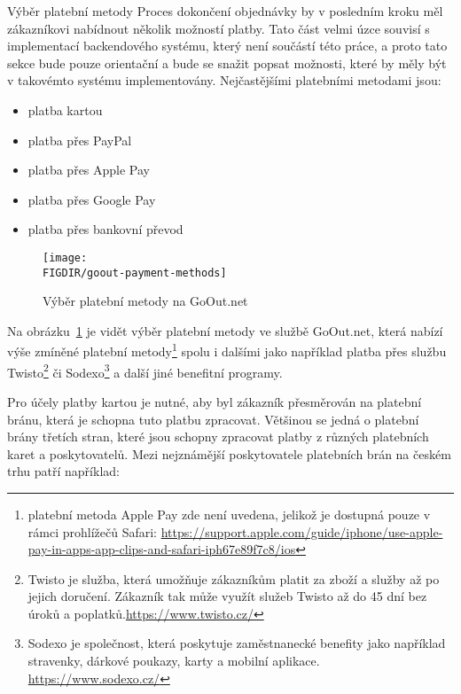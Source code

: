 \begin{subsection}{Výběr platební metody}
    \label{subsec:identifikace-dokonceni-objednavky-vyber-platebni-metody}
    Proces dokončení objednávky by v posledním kroku měl zákazníkovi nabídnout několik možností platby.
    Tato část velmi úzce souvisí s implementací backendového systému, který není součástí této práce, a proto tato sekce bude pouze orientační a bude se snažit popsat možnosti, které by měly být v takovémto systému implementovány.
    Nejčastějšími platebními metodami jsou:

    \begin{itemize}
        \item platba kartou
        \item platba přes PayPal
        \item platba přes Apple Pay
        \item platba přes Google Pay
        \item platba přes bankovní převod
    \end{itemize}

    \begin{figure}[H]
        \centering
        \caption{Výběr platební metody na GoOut.net}
        \texttt{[image: \\FIGDIR/goout-payment-methods]}
        \label{fig:goout-payment-methods}
    \end{figure}

    Na obrázku~\ref{fig:goout-payment-methods} je vidět výběr platební metody ve službě GoOut.net, která nabízí výše zmíněné platební metody\footnote{platební metoda Apple Pay zde není uvedena, jelikož je dostupná pouze v rámci prohlížečů Safari: \url{https://support.apple.com/guide/iphone/use-apple-pay-in-apps-app-clips-and-safari-iph67e89f7c8/ios}} spolu i dalšími jako například platba přes službu Twisto\footnote{Twisto je služba, která umožňuje zákazníkům platit za zboží a služby až po jejich doručení. Zákazník tak může využít služeb Twisto až do 45 dní bez úroků a poplatků.\url{https://www.twisto.cz/}} či Sodexo\footnote{Sodexo je společnost, která poskytuje zaměstnanecké benefity jako například stravenky, dárkové poukazy, karty a mobilní aplikace. \url{https://www.sodexo.cz/}} a další jiné benefitní programy.

    Pro účely platby kartou je nutné, aby byl zákazník přesměrován na platební bránu, která je schopna tuto platbu zpracovat.
    Většinou se jedná o platební brány třetích stran, které jsou schopny zpracovat platby z různých platebních karet a poskytovatelů.
    Mezi nejznámější poskytovatele platebních brán na českém trhu patří například:


\end{subsection}
